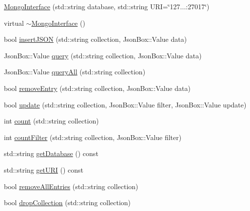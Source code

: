 \begin{DoxyCompactItemize}
\item 
\hyperlink{classmongoapi_1_1MongoInterface_ab0be108c960a6cb1cf926e90c67dc6a2}{Mongo\+Interface} (std\+::string database, std\+::string U\+RI=\char`\"{}127...\+:27017\char`\"{})
\item 
virtual \hyperlink{classmongoapi_1_1MongoInterface_ab04b30920b692570cf39a232bad39e31}{$\sim$\+Mongo\+Interface} ()
\item 
bool \hyperlink{classmongoapi_1_1MongoInterface_abd351b10712380d3cc3a9fdfea045816}{insert\+J\+S\+ON} (std\+::string collection, Json\+Box\+::\+Value data)
\item 
Json\+Box\+::\+Value \hyperlink{classmongoapi_1_1MongoInterface_a5be1cd9378f89523963212a58c126205}{query} (std\+::string collection, Json\+Box\+::\+Value data)
\item 
Json\+Box\+::\+Value \hyperlink{classmongoapi_1_1MongoInterface_ae85cc136f15074ba9e7dabcc7de1ac0b}{query\+All} (std\+::string collection)
\item 
bool \hyperlink{classmongoapi_1_1MongoInterface_a3ef36851d7f551223f72faa6bb355f99}{remove\+Entry} (std\+::string collection, Json\+Box\+::\+Value data)
\item 
bool \hyperlink{classmongoapi_1_1MongoInterface_a2dccbb59fb1fd7ea81d946e84e592561}{update} (std\+::string collection, Json\+Box\+::\+Value filter, Json\+Box\+::\+Value update)
\item 
int \hyperlink{classmongoapi_1_1MongoInterface_ad938ece65fafa37c0517f20fcf0fed9d}{count} (std\+::string collection)
\item 
int \hyperlink{classmongoapi_1_1MongoInterface_a889dc36348bbb47d0867c628d3c8534e}{count\+Filter} (std\+::string collection, Json\+Box\+::\+Value filter)
\item 
std\+::string \hyperlink{classmongoapi_1_1MongoInterface_a39d9fd2dc8b9bf2e6b9590504d02a811}{get\+Database} () const 
\item 
std\+::string \hyperlink{classmongoapi_1_1MongoInterface_a7f95673d3c950679fb64190862c127fc}{get\+U\+RI} () const 
\item 
bool \hyperlink{classmongoapi_1_1MongoInterface_a3721592cc497178f8c8e0567c7439991}{remove\+All\+Entries} (std\+::string collection)
\item 
bool \hyperlink{classmongoapi_1_1MongoInterface_a18c2763a4f06cf1e717875007bb47963}{drop\+Collection} (std\+::string collection)
\end{DoxyCompactItemize}


